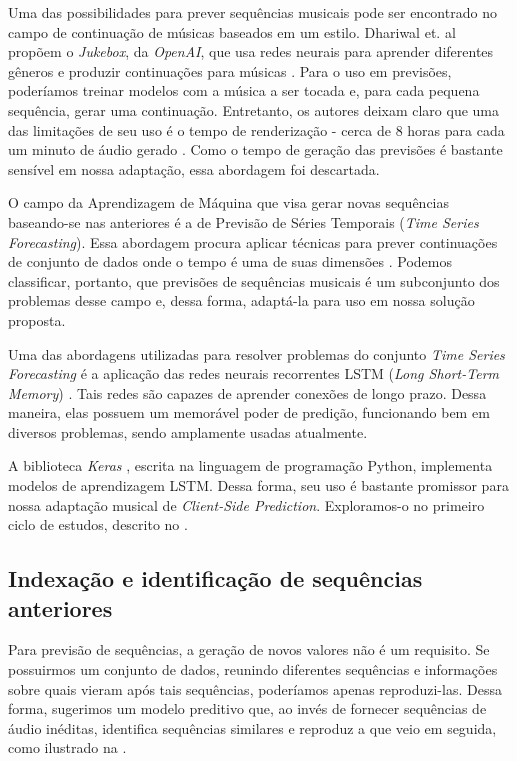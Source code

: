 Uma das possibilidades para prever sequências musicais pode ser encontrado no campo de continuação de músicas baseados em um estilo. Dhariwal et. al propõem o \textit{Jukebox}, da \textit{OpenAI}, que usa redes neurais para aprender diferentes gêneros e produzir continuações para músicas \cite{jukebox}. Para o uso em previsões, poderíamos treinar modelos com a música a ser tocada e, para cada pequena sequência, gerar uma continuação. Entretanto, os autores deixam claro que uma das limitações de seu uso é o tempo de renderização - cerca de 8 horas para cada um minuto de áudio gerado \cite{jukebox}. Como o tempo de geração das previsões é bastante sensível em nossa adaptação, essa abordagem foi descartada.

O campo da Aprendizagem de Máquina que visa gerar novas sequências baseando-se nas anteriores é a de Previsão de Séries Temporais (\textit{Time Series Forecasting}). Essa abordagem procura aplicar técnicas para prever continuações de conjunto de dados onde o tempo é uma de suas dimensões \cite{time_series_forecasting}. Podemos classificar, portanto, que previsões de sequências musicais é um subconjunto dos problemas desse campo e, dessa forma, adaptá-la para uso em nossa solução proposta.

Uma das abordagens utilizadas para resolver problemas do conjunto \textit{Time Series Forecasting} é a aplicação das redes neurais recorrentes LSTM (\textit{Long Short-Term Memory}) \cite{lstm}. Tais redes são capazes de aprender conexões de longo prazo. Dessa maneira, elas possuem um memorável poder de predição, funcionando bem em diversos problemas, sendo amplamente usadas atualmente.

A biblioteca \textit{Keras} \cite{keras}, escrita na linguagem de programação Python, implementa modelos de aprendizagem LSTM. Dessa forma, seu uso é bastante promissor para nossa adaptação musical de \textit{Client-Side Prediction}. Exploramos-o no primeiro ciclo de estudos, descrito no .

\subsection{Indexação e identificação de sequências anteriores}
\label{subsec:indexation_and_identification}

Para previsão de sequências, a geração de novos valores não é um requisito. Se possuirmos um conjunto de dados, reunindo diferentes sequências e informações sobre quais vieram após tais sequências, poderíamos apenas reproduzi-las. Dessa forma, sugerimos um modelo preditivo que, ao invés de fornecer sequências de áudio inéditas, identifica sequências similares e reproduz a que veio em seguida, como ilustrado na .

